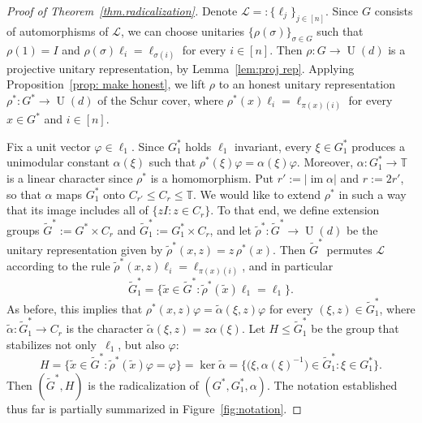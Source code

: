 \begin{proof}[Proof of Theorem~\ref{thm.radicalization}]
Denote $\mathscr{L} =: \{ \ell_j \}_{j \in [n]}$.
Since $G$ consists of automorphisms of $\mathscr{L}$, we can choose unitaries $\{ \rho(\sigma) \}_{\sigma \in G}$ such that $\rho(1) = I$ and $\rho(\sigma) \ell_i = \ell_{\sigma(i)}$ for every $i \in [n]$.
Then $\rho \colon G \to \operatorname{U}(d)$ is a projective unitary representation, by Lemma~\ref{lem:proj rep}.
Applying Proposition~\ref{prop: make honest}, we lift $\rho$ to an honest unitary representation $\rho^* \colon G^* \to \operatorname{U}(d)$ of the Schur cover, where $\rho^*(x) \ell_i = \ell_{\pi(x)(i)}$ for every $x \in G^*$ and $i \in [n]$.

Fix a unit vector $\varphi \in \ell_1$.
Since $G_1^*$ holds $\ell_1$ invariant, every $\xi \in G_1^*$ produces a unimodular constant $\alpha(\xi)$ such that $\rho^*(\xi) \varphi = \alpha(\xi) \varphi$.
Moreover, $\alpha \colon G_1^* \to \mathbb{T}$ is a linear character since $\rho^*$ is a homomorphism.
Put $r' := |\operatorname{im} \alpha|$ and $r := 2r'$, so that $\alpha$ maps $G_1^*$ onto $C_{r'} \leq C_r \leq \mathbb{T}$.
We would like to extend $\rho^*$ in such a way that its image includes all of $\{z I : z \in C_r\}$.
To that end, we define extension groups $\widetilde{G}^* := G^* \times C_r$ and $\widetilde{G}_1^* := G_1^* \times C_r$, and let $\tilde{\rho}^* \colon \widetilde{G}^* \to \operatorname{U}(d)$ be the unitary representation given by $\tilde{\rho}^*(x,z) = z\, \rho^*(x)$.
Then $\widetilde{G}^*$ permutes $\mathscr{L}$ according to the rule $\tilde{\rho}^*(x,z) \ell_i = \ell_{\pi(x)(i)}$, and in particular
\begin{equation}
\label{eq: line stabilizer}
\widetilde{G}_1^* = \bigl\{ \tilde{x} \in \widetilde{G}^* : \tilde{\rho}^*(\tilde{x}) \ell_1 = \ell_1 \bigr\}.
\end{equation}
As before, this implies that $\rho^*(x,z) \varphi = \widetilde{\alpha}(\xi,z) \varphi$ for every $(\xi,z) \in \widetilde{G}_1^*$, where $\widetilde{\alpha} \colon \widetilde{G}_1^* \to C_r$ is the character $\widetilde{\alpha}(\xi,z) = z \alpha(\xi)$.
Let $H \leq \widetilde{G}_1^*$ be the group that stabilizes not only~$\ell_1$, but also $\varphi$:
\[ H = \bigl\{ \tilde{x} \in \widetilde{G}^* : \tilde{\rho}^*(\tilde{x}) \varphi = \varphi \bigr\} = \ker \widetilde{\alpha} = \bigl\{ \bigl(\xi,\alpha(\xi)^{-1}\bigr) \in \widetilde{G}_1^* : \xi \in G_1^* \bigr\}. \]
Then $(\widetilde{G}^*, H)$ is the radicalization of $(G^*,G^*_1,\alpha)$.
The notation established thus far is partially summarized in Figure~\ref{fig:notation}.


\end{proof}
